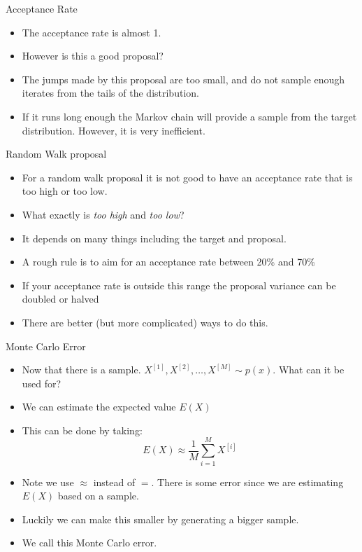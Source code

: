 \documentclass[10pt]{beamer}
\begin{document}
\begin{frame}{Acceptance Rate}
\begin{itemize}
\item The acceptance rate is almost 1.

\item However is this a good proposal?

\item The jumps made by this proposal are too small, and do not sample enough iterates from the tails of the distribution.

\item If it runs long enough the Markov chain will provide a sample from the target distribution.  However, it is very inefficient.
\end{itemize}
\end{frame}
\begin{frame}{Random Walk proposal}
\begin{itemize}
\item For a random walk proposal it is not good to have an acceptance rate that is too high or too low.

\item What exactly is {\em too high} and {\em too low}?

\item It depends on many things including the target and proposal.

\item A rough rule is to aim for an acceptance rate between 20\% and 70\%

\item If your acceptance rate is outside this range the proposal variance can be doubled or halved

\item There are better (but more complicated) ways to do this.
\end{itemize}
\end{frame}
\begin{frame}{Monte Carlo Error}
\begin{itemize}
\item Now that there is a sample. $X^{[1]},X^{[2]},\ldots,X^{[M]}\sim p(x)$. What can it be used for?

\item We can estimate the expected value $E(X)$

\item This can be done by taking:
\begin{equation*}
E(X)\approx \frac{1}{M}\sum_{i=1}^M X^{[i]}
\end{equation*}

\item Note we use $\approx$ instead of $=$.  There is some error since we are estimating $E(X)$ based on a sample.

\item Luckily we can make this smaller by generating a bigger sample.

\item We call this Monte Carlo error.
\end{itemize}
\end{frame}
\end{document}
